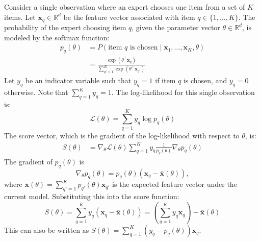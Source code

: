 \documentclass{article}
\begin{document}
Consider a single observation where an expert chooses one item from a set of $K$ items. Let $\mathbf{x}_q \in \mathbb{R}^d$ be the feature vector associated with item $q \in \{1, \dots, K\}$. The probability of the expert choosing item $q$, given the parameter vector $\theta \in \mathbb{R}^d$, is modeled by the softmax function:
\begin{align*}
p_q(\theta)
&= P(\text{item } q \text{ is chosen} \mid \mathbf{x}_1, \dots, \mathbf{x}_K, \theta) \\
&= \frac{\exp(\theta^\top \mathbf{x}_q)}{\sum_{q'=1}^K \exp(\theta^\top \mathbf{x}_{q'})}
\end{align*}
Let $y_q$ be an indicator variable such that $y_q=1$ if item $q$ is chosen, and $y_q=0$ otherwise. Note that $\sum_{q=1}^K y_q = 1$. The log-likelihood for this single observation is:
\[ \mathcal{L}(\theta) = \sum_{q=1}^K y_q \log p_q(\theta) \]
The score vector, which is the gradient of the log-likelihood with respect to $\theta$, is:
\begin{align*}
S(\theta) &= \nabla_\theta \mathcal{L}(\theta) \sum_{q=1}^K y_q \frac{1}{p_q(\theta)} \nabla_\theta p_q(\theta)
\end{align*}
The gradient of $p_q(\theta)$ is
\[
\nabla_\theta p_q(\theta) = p_q(\theta) (\mathbf{x}_q - \bar{\mathbf{x}}(\theta)),
\]
where $\bar{\mathbf{x}}(\theta) = \sum_{q'=1}^K p_{q'}(\theta) \mathbf{x}_{q'}$ is the expected feature vector under the current model.
Substituting this into the score function:
\[ S(\theta) = \sum_{q=1}^K y_q (\mathbf{x}_q - \bar{\mathbf{x}}(\theta)) = \left(\sum_{q=1}^K y_q \mathbf{x}_q\right) - \bar{\mathbf{x}}(\theta) \]
This can also be written as $S(\theta) = \sum_{q=1}^K (y_q - p_q(\theta))\mathbf{x}_q$.
\end{document}
